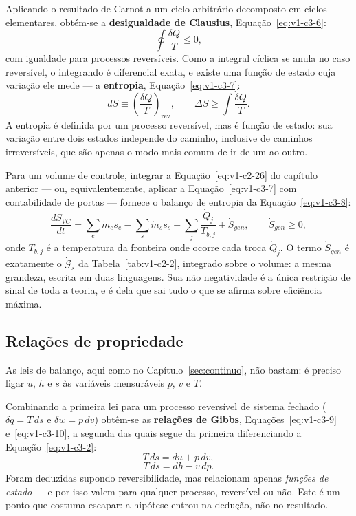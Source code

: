 \documentclass[12pt,a4paper]{article}
\numberwithin{equation}{section}
\numberwithin{table}{section}
\numberwithin{figure}{section}
\begin{document}
Aplicando o resultado de Carnot a um ciclo arbitrário decomposto em ciclos
elementares, obtém-se a \textbf{desigualdade de Clausius},
Equação~\eqref{eq:v1-c3-6}:
\begin{equation}\label{eq:v1-c3-6}
\oint \frac{\delta Q}{T} \le 0,
\end{equation}
com igualdade para processos reversíveis. Como a integral cíclica se anula no
caso reversível, o integrando é diferencial exata, e existe uma função de
estado cuja variação ele mede --- a \textbf{entropia},
Equação~\eqref{eq:v1-c3-7}:
\begin{equation}\label{eq:v1-c3-7}
dS \equiv \left(\frac{\delta Q}{T}\right)_{\text{rev}},
\qquad
\Delta S \ge \int \frac{\delta Q}{T} .
\end{equation}
A entropia é definida por um processo reversível, mas é função de estado: sua
variação entre dois estados independe do caminho, inclusive de caminhos
irreversíveis, que são apenas o modo mais comum de ir de um ao outro.

Para um volume de controle, integrar a Equação~\eqref{eq:v1-c2-26} do capítulo
anterior --- ou, equivalentemente, aplicar a Equação~\eqref{eq:v1-c3-7} com
contabilidade de portas --- fornece o balanço de entropia da
Equação~\eqref{eq:v1-c3-8}:
\begin{equation}\label{eq:v1-c3-8}
\frac{dS_{VC}}{dt} = \sum_{e}\dot{m}_e s_e - \sum_{s}\dot{m}_s s_s +
\sum_j \frac{\dot{Q}_j}{T_{b,j}} + \dot{S}_{gen},
\qquad \dot{S}_{gen} \ge 0 ,
\end{equation}
onde $T_{b,j}$ é a temperatura da fronteira onde ocorre cada troca $\dot Q_j$.
O termo $\dot{S}_{gen}$ é exatamente o $\dot{\mathcal{G}}_s$ da
Tabela~\ref{tab:v1-c2-2}, integrado sobre o volume: a mesma grandeza, escrita
em duas linguagens. Sua não negatividade é a única restrição de sinal de toda
a teoria, e é dela que sai tudo o que se afirma sobre eficiência máxima.

\subsection{Relações de propriedade}\label{sub:v1-c3-propriedades}

As leis de balanço, aqui como no Capítulo~\ref{sec:continuo}, não bastam: é
preciso ligar $u$, $h$ e $s$ às variáveis mensuráveis $p$, $v$ e $T$.

Combinando a primeira lei para um processo reversível de sistema fechado
($\delta q = T\,ds$ e $\delta w = p\,dv$) obtêm-se as \textbf{relações de
Gibbs}, Equações~\eqref{eq:v1-c3-9} e~\eqref{eq:v1-c3-10}, a segunda das quais
segue da primeira diferenciando a Equação~\eqref{eq:v1-c3-2}:
\begin{equation}\label{eq:v1-c3-9}
T\,ds = du + p\,dv,
\end{equation}
\begin{equation}\label{eq:v1-c3-10}
T\,ds = dh - v\,dp .
\end{equation}
Foram deduzidas supondo reversibilidade, mas relacionam apenas \emph{funções de
estado} --- e por isso valem para qualquer processo, reversível ou não. Este é
um ponto que costuma escapar: a hipótese entrou na dedução, não no resultado.
\end{document}
